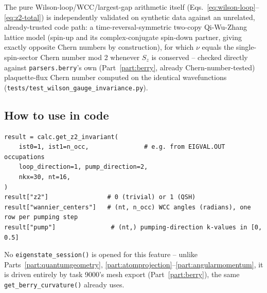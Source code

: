 \documentclass[11pt]{article}
\begin{document}
The pure Wilson-loop/WCC/largest-gap
arithmetic itself (Eqs.~\eqref{eq:wilson-loop}--\eqref{eq:z2-total}) is independently
validated on synthetic data against an unrelated, already-trusted code path: a
time-reversal-symmetric two-copy Qi-Wu-Zhang lattice model (spin-up and its
complex-conjugate spin-down partner, giving exactly opposite Chern numbers by
construction), for which $\nu$ equals the single-spin-sector Chern number mod 2 whenever
$S_z$ is conserved \cite{kanemele2005} -- checked directly against
\texttt{parsers.berry}'s own (Part~\ref{part:berry}, already Chern-number-tested)
plaquette-flux Chern number computed on the identical wavefunctions
(\texttt{tests/test\_wilson\_gauge\_invariance.py}).

\subsection{How to use in code}

\begin{verbatim}
result = calc.get_z2_invariant(
    ist0=1, ist1=n_occ,               # e.g. from EIGVAL.OUT occupations
    loop_direction=1, pump_direction=2,
    nkx=30, nt=16,
)
result["z2"]                # 0 (trivial) or 1 (QSH)
result["wannier_centers"]   # (nt, n_occ) WCC angles (radians), one row per pumping step
result["pump"]               # (nt,) pumping-direction k-values in [0, 0.5]
\end{verbatim}
No \texttt{eigenstate\_session()} is opened for this feature -- unlike
Parts~\ref{part:quantumgeometry}, \ref{part:atomprojection}--\ref{part:angularmomentum}, it is
driven entirely by task 9000's mesh export (Part~\ref{part:berry}), the same
\texttt{get\_berry\_curvature()} already uses.
\end{document}
